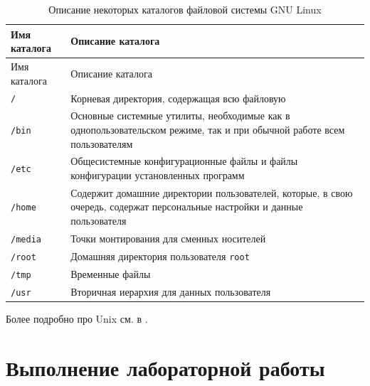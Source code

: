 \documentclass[
  english,
  russian,
  12pt,
  a4paper,
  DIV=11,
  numbers=noendperiod]{scrreprt}
\begin{document}
\begin{longtable}[]{@{}
  >{\raggedright\arraybackslash}p{}
  >{\raggedright\arraybackslash}p{}@{}}
\caption{Описание некоторых каталогов файловой системы GNU
Linux}\label{tbl-std-dir}\tabularnewline
\toprule\noalign{}
\begin{minipage}[b]{\linewidth}\raggedright
Имя каталога
\end{minipage} & \begin{minipage}[b]{\linewidth}\raggedright
Описание каталога
\end{minipage} \\
\midrule\noalign{}
\endfirsthead
\toprule\noalign{}
\begin{minipage}[b]{\linewidth}\raggedright
Имя каталога
\end{minipage} & \begin{minipage}[b]{\linewidth}\raggedright
Описание каталога
\end{minipage} \\
\midrule\noalign{}
\endhead
\bottomrule\noalign{}
\endlastfoot
\texttt{/} & Корневая директория, содержащая всю файловую \\
\texttt{/bin} & Основные системные утилиты, необходимые как в
однопользовательском режиме, так и при обычной работе всем
пользователям \\
\texttt{/etc} & Общесистемные конфигурационные файлы и файлы
конфигурации установленных программ \\
\texttt{/home} & Содержит домашние директории пользователей, которые, в
свою очередь, содержат персональные настройки и данные пользователя \\
\texttt{/media} & Точки монтирования для сменных носителей \\
\texttt{/root} & Домашняя директория пользователя \texttt{root} \\
\texttt{/tmp} & Временные файлы \\
\texttt{/usr} & Вторичная иерархия для данных пользователя \\
\end{longtable}

Более подробно про Unix см. в
\autocite{tanenbaum_book_modern-os_ru,robbins_book_bash_en,zarrelli_book_mastering-bash_en,newham_book_learning-bash_en}.

\chapter{Выполнение лабораторной
работы}\label{ux432ux44bux43fux43eux43bux43dux435ux43dux438ux435-ux43bux430ux431ux43eux440ux430ux442ux43eux440ux43dux43eux439-ux440ux430ux431ux43eux442ux44b}
\end{document}
